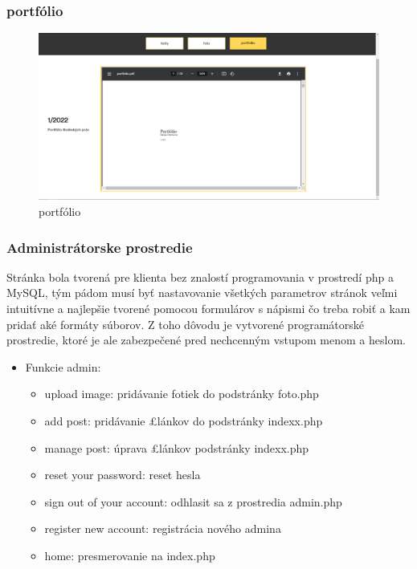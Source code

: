 \begin{frame}\frametitle{portfólio}
  \begin{figure}[htb]
    \centering
    \includegraphics[scale=0.3]{portfolko.png}
    \caption{portfólio}
  \end{figure}

\end{frame}

\begin{frame}\frametitle{Administrátorske prostredie}
Stránka bola tvorená pre klienta bez znalostí programovania v prostredí php
a MySQL, tým pádom musí byť nastavovanie všetkých parametrov stránok veľmi intuitívne a najlepšie tvorené pomocou formulárov s nápismi čo treba robiť a kam pridať aké
formáty súborov. Z toho dôvodu je vytvorené programátorské prostredie, ktoré je ale zabezpečené pred nechcenným vstupom menom a heslom. 

 \begin{itemize}
 \item Funkcie admin:
           \begin{itemize}
          \item upload image: pridávanie fotiek do podstránky foto.php
          \item add post: pridávanie £lánkov do podstránky indexx.php
          \item manage post: úprava £lánkov podstránky indexx.php
          \item reset your password: reset hesla
          \item sign out of your account: odhlasit sa z prostredia admin.php
          \item register new account: registrácia nového admina
          \item home: presmerovanie na index.php
         \end{itemize}
 \end{itemize}
       

\end{frame}

